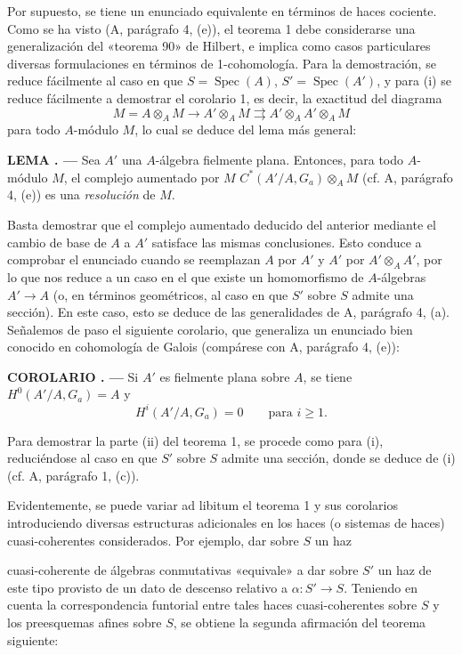 \documentclass[11pt,twoside,openany]{book}
\numberwithin{equation}{section}
\newcommand{\src}[1]{%
  \phantomsection\hypertarget{src:#1}{}%
  \marginpar{\raggedleft\footnotesize\sffamily #1}%
}
\theoremstyle{plain}
\theoremstyle{definition}
\theoremstyle{remark}
\newcommand{\result}[2]{%
  \par\medskip\noindent\textbf{#1%
  \if\relax\detokenize{#2}\relax\else\space#2\fi. ---}\enspace
}
\newcommand{\FgaUnitKey}{frontmatter}
\renewcommand{\src}[1]{%
  \phantomsection\hypertarget{src:\FgaUnitKey:#1}{}%
  \marginpar{\raggedleft\footnotesize\sffamily #1}%
}
\theoremstyle{plain}
\theoremstyle{definition}
\theoremstyle{remark}
\begin{document}
Por supuesto, se tiene un enunciado equivalente en términos de haces
cociente. Como se ha visto (A, parágrafo 4, (e)), el teorema 1 debe considerarse
una generalización del «teorema 90» de Hilbert, e implica como casos
particulares diversas formulaciones en términos de 1-cohomología. Para la
demostración, se reduce fácilmente al caso en que $S=\operatorname{Spec}(A)$,
$S'=\operatorname{Spec}(A')$, y para (i) se reduce fácilmente a demostrar el
corolario 1, es decir, la exactitud del diagrama
\[
  M=A\otimes_A M\longrightarrow A'\otimes_A M
  \rightrightarrows A'\otimes_AA'\otimes_A M
\]
para todo $A$-módulo $M$, lo cual se deduce del lema más general:

\result{LEMA}{1.1} Sea $A'$ una $A$-álgebra fielmente plana. Entonces, para
todo $A$-módulo $M$, el complejo aumentado por $M$
$C^*(A'/A,G_a)\otimes_A M$ (cf. A, parágrafo 4, (e)) es una
\emph{resolución} de $M$.

Basta demostrar que el complejo aumentado deducido del anterior mediante el
cambio de base de $A$ a $A'$ satisface las mismas conclusiones. Esto conduce a
comprobar el enunciado cuando se reemplazan $A$ por $A'$ y $A'$ por
$A'\otimes_AA'$, por lo que nos reduce a un caso en el que existe un
homomorfismo de $A$-álgebras $A'\longrightarrow A$ (o, en términos
geométricos, al caso en que $S'$ sobre $S$ admite una sección). En este caso,
esto se deduce de las generalidades de A, parágrafo 4, (a). Señalemos de paso
el siguiente corolario, que generaliza un enunciado bien conocido en
cohomología de Galois (compárese con A, parágrafo 4, (e)):

\result{COROLARIO}{} Si $A'$ es fielmente plana sobre $A$, se tiene
$H^0(A'/A,G_a)=A$ y
\[
  H^i(A'/A,G_a)=0\qquad\text{para $i\geq1$}.
\]

Para demostrar la parte (ii) del teorema 1, se procede como para (i),
reduciéndose al caso en que $S'$ sobre $S$ admite una sección, donde se deduce
de (i) (cf. A, parágrafo 1, (c)).

Evidentemente, se puede variar ad libitum el teorema 1 y sus corolarios
introduciendo diversas estructuras adicionales en los haces (o sistemas de
haces) cuasi-coherentes considerados. Por ejemplo, dar sobre $S$ un haz
\src{317}
cuasi-coherente de álgebras conmutativas «equivale» a dar sobre $S'$ un haz de
este tipo provisto de un dato de descenso relativo a
$\alpha:S'\longrightarrow S$. Teniendo en cuenta la correspondencia funtorial
entre tales haces cuasi-coherentes sobre $S$ y los preesquemas afines sobre
$S$, se obtiene la segunda afirmación del teorema siguiente:
\end{document}
